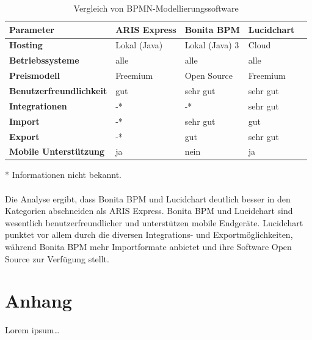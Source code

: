 \begin{table}[h]
\begin{tabularx}{\textwidth}{|X|l|l|l|l|}
	\hline
	\textbf{Parameter}  & \textbf{ARIS Express} &
	\textbf{Bonita BPM} & \textbf{Lucidchart}  \\
	\hline
	\hline
	\textbf{Hosting} & Lokal (Java) & Lokal (Java) 3 & Cloud \\
	\hline
	\textbf{Betriebssysteme} & alle & alle & alle \\
	\hline
	\textbf{Preismodell} & Freemium & Open Source &  Freemium\\
	\hline
	\textbf{Benutzerfreundlichkeit} & gut & sehr gut & sehr gut \\
	\hline
	\textbf{Integrationen} & -* & -* & sehr gut \\
	\hline
	\textbf{Import} & -* & sehr gut & gut \\
	\hline
	\textbf{Export} & -* & gut & sehr gut \\
	\hline
	\textbf{Mobile Unterstützung} & ja & nein & ja \\
	\hline
\end{tabularx}
\caption{Vergleich von BPMN-Modellierungssoftware}
\end{table}
* Informationen nicht bekannt.
\\
\\
Die Analyse ergibt, dass Bonita BPM und Lucidchart deutlich
besser in den Kategorien abschneiden als ARIS Express. Bonita BPM und Lucidchart
sind wesentlich benutzerfreundlicher und unterstützen mobile
Endgeräte. Lucidchart punktet vor allem durch die diversen Integrations- und
Exportmöglichkeiten, während Bonita BPM mehr Importformate anbietet und ihre
Software Open Source zur Verfügung stellt.



\clearpage
\section{Anhang}

Lorem ipsum\ldots
